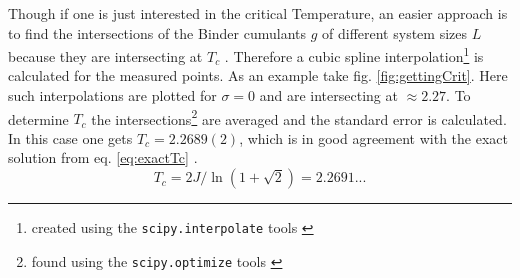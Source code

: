     Though if one is just interested in the critical Temperature, an
    easier approach is to find the intersections of the Binder cumulants
    \(g\) of different system sizes \(L\) because they are intersecting
    at \(T_c\) \cite{Binder1981}.
    Therefore a cubic spline interpolation\footnote{created using the \texttt{scipy.interpolate} tools \cite{scipy2001}}
    is calculated for the measured points.
    As an example take fig. \ref{fig:gettingCrit}.
    Here such interpolations are plotted for \(\sigma=0\) and are
    intersecting at \(\approx 2.27\).
    To determine \(T_c\) the intersections\footnote{found using the \texttt{scipy.optimize} tools \cite{scipy2001}}
    are averaged and the standard error is calculated. In this case one
    gets \(T_c = 2.2689(2)\), which is in good agreement with the
    exact solution from eq. \eqref{eq:exactTc} \cite{Onsager1944}.
    \begin{equation}
        T_c = 2J/\ln(1+\sqrt 2) = 2.2691...
        \label{eq:exactTc}
    \end{equation}

